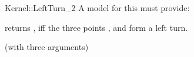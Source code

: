 \begin{ccRefFunctionObjectConcept}{Kernel::LeftTurn_2}
A model for this must provide:


{returns , iff the three points ,  
and  form a left turn.}

\ccRefines
{} (with three arguments)

\ccSeeAlso
{}\\

\end{ccRefFunctionObjectConcept}
